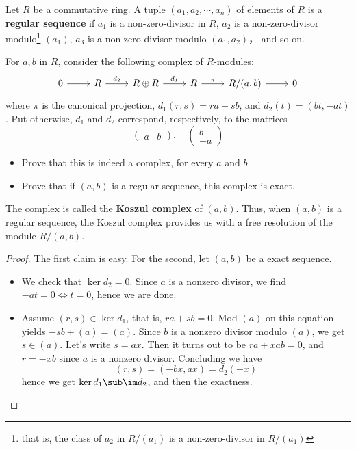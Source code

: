 \begin{exercise}\label{Kos comp-1}
Let $R$ be a commutative ring. A tuple $(a_1,a_2,\cdots,a_n)$ of elements of $R$ is a \textbf{regular sequence} if $a_1$ is a non-zero-divisor in $R$, $a_2$ is a non-zero-divisor modulo\footnote{that is, the class of $a_2$ in $R/(a_1)$ is a non-zero-divisor in $R/(a_1)$} $(a_1)$, $a_3$ is a non-zero-divisor modulo $(a_1,a_2)$， and so on.\par
For $a,b$ in $R$, consider the following complex of $R$-modules:
\[\begin{tikzcd}
0\ar[r]&R\ar[r,"d_2"]&R\oplus R\ar[r,"d_1"]&R\ar[r,"\pi"]&R/(a,b)\ar[r]&0
\end{tikzcd}\]
where $\pi$ is the canonical projection, $d_1(r,s)=ra+sb$, and $d_2(t)=(bt,-at)$. Put
otherwise, $d_1$ and $d_2$ correspond, respectively, to the matrices
\[\begin{pmatrix}
a &b
\end{pmatrix},\quad\begin{pmatrix}
b\\
-a
\end{pmatrix}\]
\begin{itemize}
\item Prove that this is indeed a complex, for every $a$ and $b$.
\item Prove that if $(a,b)$ is a regular sequence, this complex is exact.
\end{itemize}
The complex is called the \textbf{Koszul complex} of $(a,b)$. Thus, when $(a,b)$ is a regular sequence, the Koszul complex provides us with a free resolution of the module $R/(a,b)$.
\end{exercise}
\begin{proof}
The first claim is easy. For the second, let $(a,b)$ be a exact sequence.
\begin{itemize}
\item We check that $\ker d_2=0$. Since $a$ is a nonzero divisor, we find $-at=0\iff t=0$, hence we are done.
\item Assume $(r,s)\in\ker d_1$, that is, $ra+sb=0$. Mod $(a)$ on this equation yields $-sb+(a)=(a)$. Since $b$ is a nonzero divisor modulo $(a)$, we get $s\in (a)$. Let's write $s=ax$. Then it turns out to be $ra+xab=0$, and $r=-xb$ since $a$ is a nonzero divisor. Concluding we have
\[(r,s)=(-bx,ax)=d_2(-x)\]
hence we get $\ker d_1\sub \im d_2$, and then the exactness.
\end{itemize}
\end{proof}
